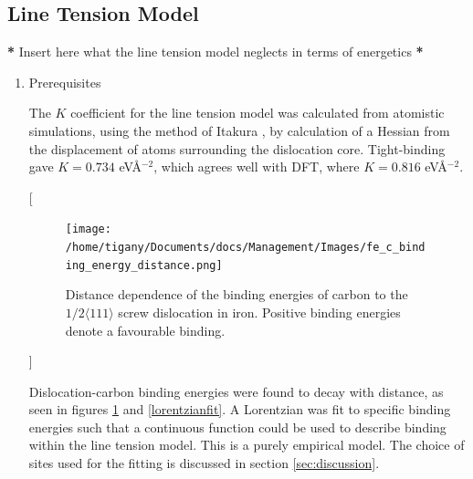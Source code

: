 \documentclass[a4paper,12pt,oneside,print,numbered,index,PageStyleIII]{PhDThesisPSnPDF}
\begin{document}
\subsection{Line Tension Model}
\label{sec:orgb8fbbf1}
\label{sec:ltmodel}

\textbf{*} Insert here what the line tension model neglects in terms of energetics \textbf{*}
\begin{enumerate}
\item Prerequisites
\label{sec:orgd6d58ad}

The \(K\) coefficient for the line tension model was calculated from atomistic simulations, using
the method of Itakura \cite{Itakura2012}, by calculation of a Hessian from the displacement of
atoms surrounding the dislocation core. Tight-binding gave \(K = 0.734\) eV\AA{}\(^{-2}\), which agrees well
with DFT, where \(K = 0.816\) eV\AA{}\(^{-2}\).


[\begin{figure}[htbp]
\centering
\texttt{[image: /home/tigany/Documents/docs/Management/Images/fe\_c\_binding\_energy\_distance.png]}
\caption{Distance dependence of the binding energies of carbon to the \(1/2\langle 111 \rangle\) screw dislocation in iron. Positive binding energies denote a favourable binding. \label{distancedep}}
\end{figure}]

Dislocation-carbon binding energies were found to decay with distance, as seen in figures
\ref{distancedep} and \ref{lorentzianfit}. A Lorentzian was fit to specific binding energies such
that a continuous function could be used to describe binding within
the line tension model. This is a purely empirical model. The
choice of sites used for the fitting is discussed in section
\ref{sec:discussion}.





\end{enumerate}
\end{document}
